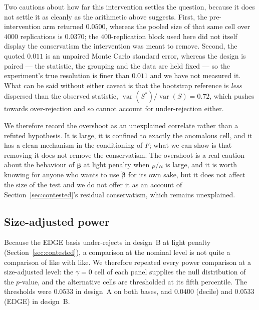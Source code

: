 \documentclass[11pt,a4paper]{article}
\DeclareMathOperator{\var}{var}
\newcommand{\bbt}{\tilde{\boldsymbol{\beta}}}
\theoremstyle{plain}
\theoremstyle{remark}
\begin{document}
Two cautions about how far this intervention settles the question, because it does not
settle it as cleanly as the arithmetic above suggests. First, the pre-intervention arm
returned $0.0500$, whereas the pooled size of that same cell over $4000$ replications is
$0.0370$; the $400$-replication block used here did not itself display the conservatism
the intervention was meant to remove. Second, the quoted $0.011$ is an unpaired Monte
Carlo standard error, whereas the design is paired --- the statistic, the grouping and the
data are held fixed --- so the experiment's true resolution is finer than $0.011$ and we
have not measured it. What can be said without either caveat is that the bootstrap
reference is \emph{less} dispersed than the observed statistic, $\var(S^{*})/\var(S) = 0.72$,
which pushes towards over-rejection and so cannot account for under-rejection either.

We therefore record the overshoot as an unexplained correlate rather than a refuted
hypothesis. It is large, it is confined to exactly the anomalous cell, and it has a clean
mechanism in the conditioning of $F$; what we can show is that removing it does not remove
the conservatism. The overshoot is a real caution about the
behaviour of $\bbt$ at light penalty when $p/n$ is large, and it is worth knowing for
anyone who wants to use $\bbt$ for its own sake, but it does not affect the size of the
test and we do not offer it as an account of Section~\ref{sec:contested}'s residual
conservatism, which remains unexplained.

\subsection{Size-adjusted power}\label{sec:sizeadj}

Because the EDGE basis under-rejects in design~B at light penalty
(Section~\ref{sec:contested}), a comparison at the nominal level is not quite a
comparison of like with like. We therefore repeated every power comparison at a
size-adjusted level: the $\gamma = 0$ cell of each panel supplies the null distribution
of the $p$-value, and the alternative cells are thresholded at its fifth percentile.
The thresholds were $0.0533$ in design~A on both bases, and $0.0400$ (decile) and
$0.0533$ (EDGE) in design~B.
\end{document}
